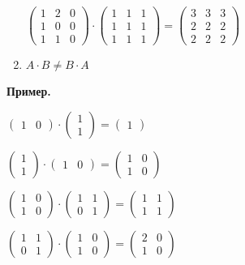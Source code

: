 \documentclass{article}
\begin{document}
\begin{enumerate}
        \( \begin{pmatrix}
            1 & 2 & 0\\
            1 & 0 & 0\\
            1 & 1 & 0
        \end{pmatrix} \cdot \begin{pmatrix}
            1 & 1 & 1\\
            1 & 1 & 1\\
            1 & 1 & 1
        \end{pmatrix} = \begin{pmatrix}
            3 & 3 & 3\\
            2 & 2 & 2\\
            2 & 2 & 2
        \end{pmatrix} \)
        \item \(A \cdot B \neq B \cdot A\)
    \end{enumerate}

    \textbf{Пример.}

    \( \begin{pmatrix}
        1 & 0
    \end{pmatrix} \cdot \begin{pmatrix}
        1\\
        1
    \end{pmatrix} = \begin{pmatrix}
        1
    \end{pmatrix} \)

    \( \begin{pmatrix}
        1\\
        1
    \end{pmatrix} \cdot \begin{pmatrix}
        1 & 0
    \end{pmatrix} = \begin{pmatrix}
        1 & 0\\
        1 & 0
    \end{pmatrix} \)

    \( \begin{pmatrix}
        1 & 0\\
        1 & 0
    \end{pmatrix} \cdot \begin{pmatrix}
        1 & 1\\
        0 & 1
    \end{pmatrix} = \begin{pmatrix}
        1 & 1\\
        1 & 1
    \end{pmatrix} \)

    \( \begin{pmatrix}
        1 & 1\\
        0 & 1
    \end{pmatrix} \cdot \begin{pmatrix}
        1 & 0\\
        1 & 0
    \end{pmatrix} = \begin{pmatrix}
        2 & 0\\
        1 & 0
    \end{pmatrix} \)
\end{document}
